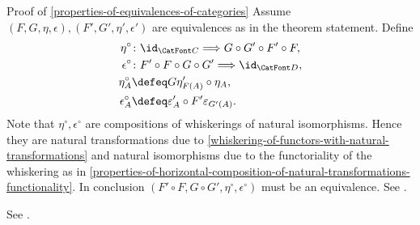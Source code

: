 \begin{Proof}{Proof of \cref{properties-of-equivalences-of-categories}}
    Assume $(F,G,\eta,\epsilon),(F',G',\eta',\epsilon')$ are equivalences as in the theorem statement.
    Define
    \begin{align*}
      \eta^\circ &\colon \id_{\CatFont C} \Longrightarrow G \circ G' \circ F' \circ F,\\
      \epsilon^\circ &\colon F' \circ F \circ G \circ G' \Longrightarrow \id_{\CatFont D},\\
      \eta^\circ_A &\defeq G \eta'_{F(A)} \circ \eta_A,\\
      \epsilon^\circ_A &\defeq \varepsilon'_A \circ F' \varepsilon_{G'(A)}.
    \end{align*}
    Note that $\eta^\circ,\epsilon^\circ$ are compositions of whiskerings of natural isomorphisms.
    Hence they are natural transformations due to \cref{whiskering-of-functors-with-natural-transformations} and natural isomorphisms due to the functoriality of the whiskering as in \cref{properties-of-horizontal-composition-of-natural-transformations-functionality}.
    In conclusion $(F' \circ F, G \circ G', \eta^\circ, \epsilon^\circ)$ must be an equivalence.
    See \cite[Proposition 4.4.5]{category-theory-in-context}.

    See \cite[Proposition 4.4]{nlab:groupoid}.
\end{Proof}
